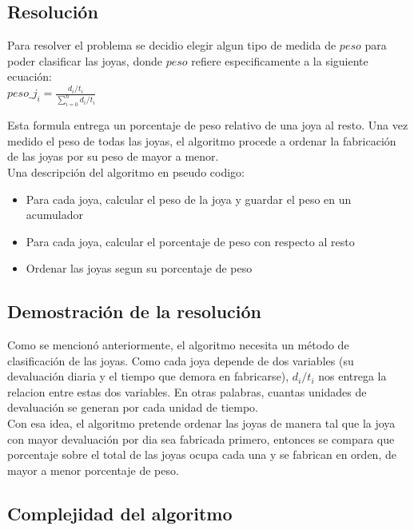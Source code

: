 \subsection{Resoluci\'on}

Para resolver el problema se decidio elegir algun tipo de medida de $peso$ para poder clasificar las joyas, donde $peso$ refiere especificamente a la siguiente ecuaci\'on: \\

$peso\_j_{i} = \frac{d_{i} / t_{i}}{\sum\limits_{i=0}^n d_{i} / t_{i}}$

Esta formula entrega un porcentaje de peso relativo de una joya al resto. Una vez medido el peso de todas las joyas, el algoritmo procede a ordenar la fabricaci\'on de las joyas por su peso de mayor a menor. \\

Una descripci\'on del algoritmo en pseudo codigo:

\begin{itemize}
\item Para cada joya, calcular el peso de la joya y guardar el peso en un acumulador
\item Para cada joya, calcular el porcentaje de peso con respecto al resto
\item Ordenar las joyas segun su porcentaje de peso
\end{itemize}

\subsection{Demostraci\'on de la resoluci\'on}

Como se mencion\'o anteriormente, el algoritmo necesita un m\'etodo de clasificaci\'on de las joyas. Como cada joya depende de dos variables (su devaluaci\'on diaria y el tiempo que demora en fabricarse), $d_{i}/t_{i}$ nos entrega la relacion entre estas dos variables. En otras palabras, cuantas unidades de devaluaci\'on se generan por cada unidad de tiempo. \\

Con esa idea, el algoritmo pretende ordenar las joyas de manera tal que la joya con mayor devaluaci\'on por dia sea fabricada primero, entonces se compara que porcentaje sobre el total de las joyas ocupa cada una y se fabrican en orden, de mayor a menor porcentaje de peso.

\subsection{Complejidad del algoritmo}

